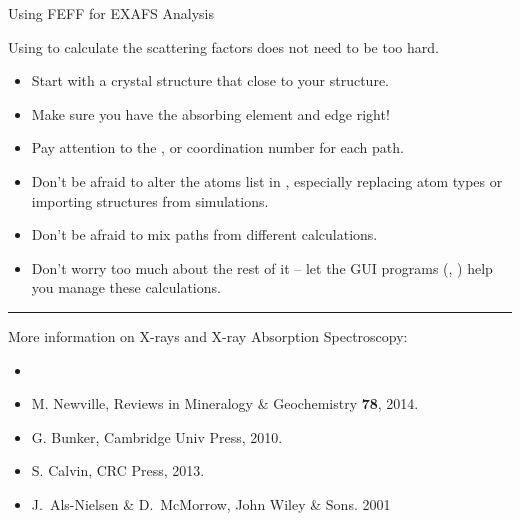 \documentclass[9pt,aspectratio=1610]{beamer}
\begin{document}
\begin{slide}{Using FEFF for EXAFS Analysis}


  \begin{cenpage}{126mm}

    Using {\feff} to calculate the scattering factors does not need to be
    too hard.

    \begin{itemize}
    \item   Start with a crystal structure that close to your structure.
    \item   Make sure you have the absorbing element and edge right!
    \item    Pay attention to the {}, or coordination number for    each path.
    \item    Don't be afraid to alter the atoms list in {\feffinp}, especially    replacing atom types or importing structures from simulations.
    \item    Don't be afraid to mix paths from different calculations.
    \item   Don't worry too much about the rest of it -- let the GUI programs    ({\xasviewer}, {\artemis}) help you manage these calculations.
    \end{itemize}

        \vmm     \hrule \vmm

  More information on X-rays and X-ray Absorption Spectroscopy:

  \begin{itemize}
  \item[] {}
  \item[] {} M. Newville, Reviews in  Mineralogy \& Geochemistry {\bf{78}}, 2014.
  \item[] {} G. Bunker, Cambridge Univ  Press,  2010.
  \item[] {} S. Calvin, CRC Press, 2013.
  \item[]  {}  J.~Als-Nielsen
    \& D.~McMorrow,  John Wiley \& Sons. 2001

  \end{itemize}

\end{cenpage}


 \vfill
\end{slide}
\end{document}
